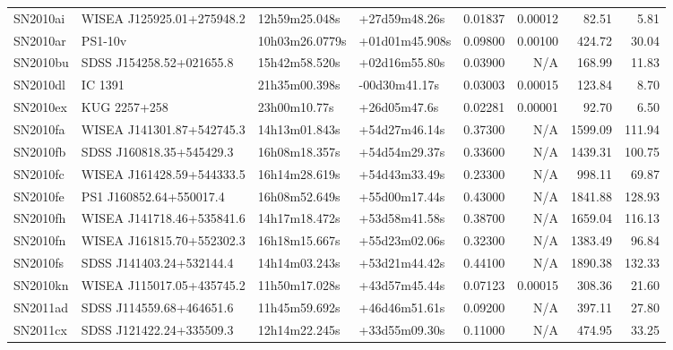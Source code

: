 \begin{longtable}{llllrrrr}
SN2010ai         &       WISEA J125925.01+275948.2 &   12h59m25.048s &   +27d59m48.26s &  0.01837 &  0.00012 &    82.51 &        5.81 \\
SN2010ar         &                         PS1-10v &  10h03m26.0779s &  +01d01m45.908s &  0.09800 &  0.00100 &   424.72 &       30.04 \\
SN2010bu         &        SDSS J154258.52+021655.8 &   15h42m58.520s &   +02d16m55.80s &  0.03900 &      N/A &   168.99 &       11.83 \\
SN2010dl         &                         IC 1391 &   21h35m00.398s &   -00d30m41.17s &  0.03003 &  0.00015 &   123.84 &        8.70 \\
SN2010ex         &                    KUG 2257+258 &    23h00m10.77s &    +26d05m47.6s &  0.02281 &  0.00001 &    92.70 &        6.50 \\
SN2010fa         &       WISEA J141301.87+542745.3 &   14h13m01.843s &   +54d27m46.14s &  0.37300 &      N/A &  1599.09 &      111.94 \\
SN2010fb         &        SDSS J160818.35+545429.3 &   16h08m18.357s &   +54d54m29.37s &  0.33600 &      N/A &  1439.31 &      100.75 \\
SN2010fc         &       WISEA J161428.59+544333.5 &   16h14m28.619s &   +54d43m33.49s &  0.23300 &      N/A &   998.11 &       69.87 \\
SN2010fe         &         PS1 J160852.64+550017.4 &   16h08m52.649s &   +55d00m17.44s &  0.43000 &      N/A &  1841.88 &      128.93 \\
SN2010fh         &       WISEA J141718.46+535841.6 &   14h17m18.472s &   +53d58m41.58s &  0.38700 &      N/A &  1659.04 &      116.13 \\
SN2010fn         &       WISEA J161815.70+552302.3 &   16h18m15.667s &   +55d23m02.06s &  0.32300 &      N/A &  1383.49 &       96.84 \\
SN2010fs         &        SDSS J141403.24+532144.4 &   14h14m03.243s &   +53d21m44.42s &  0.44100 &      N/A &  1890.38 &      132.33 \\
SN2010kn         &       WISEA J115017.05+435745.2 &   11h50m17.028s &   +43d57m45.44s &  0.07123 &  0.00015 &   308.36 &       21.60 \\
SN2011ad         &        SDSS J114559.68+464651.6 &   11h45m59.692s &   +46d46m51.61s &  0.09200 &      N/A &   397.11 &       27.80 \\
SN2011cx         &        SDSS J121422.24+335509.3 &   12h14m22.245s &   +33d55m09.30s &  0.11000 &      N/A &   474.95 &       33.25 \\

\end{longtable}
